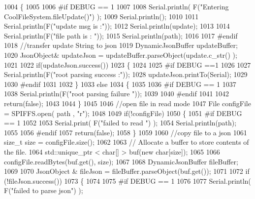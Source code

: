 \begin{DoxyCode}
1004 \{
1005 
1006 \textcolor{preprocessor}{#if DEBUG == 1}
1007 
1008     Serial.println( F(\textcolor{stringliteral}{"Entering CoolFileSystem.fileUpdate()"}) );
1009     Serial.println();
1010     
1011     Serial.println(F(\textcolor{stringliteral}{"update msg is :"}));
1012     Serial.println(update);
1013     
1014     Serial.println(F(\textcolor{stringliteral}{"file path is : "}));
1015     Serial.println(path);   
1016 
1017 \textcolor{preprocessor}{#endif}
1018     \textcolor{comment}{//transfer update String to json}
1019     DynamicJsonBuffer updateBuffer;
1020     JsonObject& updateJson = updateBuffer.parseObject(update.c\_str() );
1021     
1022     \textcolor{keywordflow}{if}(updateJson.success())
1023     \{
1024     
1025 \textcolor{preprocessor}{    #if DEBUG ==1}
1026         
1027         Serial.println(F(\textcolor{stringliteral}{"root parsing success :"}));
1028         updateJson.printTo(Serial);
1029     
1030 \textcolor{preprocessor}{    #endif}
1031 
1032     \}
1033     \textcolor{keywordflow}{else}
1034     \{
1035     
1036 \textcolor{preprocessor}{    #if DEBUG == 1 }
1037     
1038         Serial.println(F(\textcolor{stringliteral}{"root parsing failure "}));
1039     
1040 \textcolor{preprocessor}{    #endif}
1041         
1042         \textcolor{keywordflow}{return}(\textcolor{keyword}{false});  
1043 
1044     \}
1045     
1046     \textcolor{comment}{//open file in read mode}
1047     File configFile = SPIFFS.open( path , \textcolor{stringliteral}{"r"});
1048     
1049     \textcolor{keywordflow}{if}(!configFile)
1050     \{   
1051 \textcolor{preprocessor}{    #if DEBUG == 1}
1052         
1053         Serial.print( F(\textcolor{stringliteral}{"failed to read "}) );
1054         Serial.println(path);
1055 
1056 \textcolor{preprocessor}{    #endif}
1057         \textcolor{keywordflow}{return}(\textcolor{keyword}{false});
1058     \}
1059 
1060     \textcolor{comment}{//copy file to a json}
1061     \textcolor{keywordtype}{size\_t} size = configFile.size();
1062 
1063     \textcolor{comment}{// Allocate a buffer to store contents of the file.}
1064     std::unique\_ptr < char[] > buf(\textcolor{keyword}{new} \textcolor{keywordtype}{char}[size]);
1065 
1066     configFile.readBytes(buf.get(), size);
1067 
1068     DynamicJsonBuffer fileBuffer;
1069 
1070     JsonObject & fileJson = fileBuffer.parseObject(buf.get());
1071 
1072     \textcolor{keywordflow}{if} (!fileJson.success())
1073     \{
1074 
1075 \textcolor{preprocessor}{    #if DEBUG == 1}
1076 
1077         Serial.println( F(\textcolor{stringliteral}{"failed to parse json"}) );

\end{DoxyCode}
